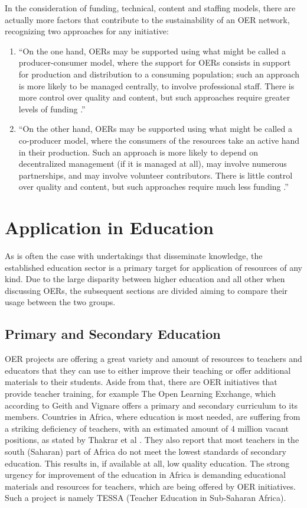 \documentclass[a4paper]{article}
\begin{document}
\noindent
In the consideration of funding, technical, content and staffing models, there are actually more factors that contribute to the sustainability of an OER network, recognizing two approaches for any initiative:
\begin{enumerate}
\item ``On the one hand, OERs may be supported using what might be called a producer-consumer model, where the support for OERs consists in support for production and distribution to a consuming population; such an approach is more likely to be managed centrally, to involve professional staff. There is more control over quality and content, but such approaches require greater levels of funding \cite{sustain}.''
\item ``On the other hand, OERs may be supported using what might be called a co-producer model, where the consumers of the resources take an active hand in their production. Such an approach is more likely to depend on decentralized management (if it is managed at all), may involve numerous partnerships, and may involve volunteer contributors. There is little control over quality and content, but such approaches require much less funding \cite{sustain}.''
\end{enumerate}

\section{Application in Education} \label{higher-ed}

As is often the case with undertakings that disseminate knowledge, the established education sector is a primary target for application of resources of any kind. Due to the large disparity between higher education and all other when discussing OERs, the subsequent sections are divided aiming to compare their usage between the two groups. 

\subsection{Primary and Secondary Education}
OER projects are offering a great variety and amount of resources to teachers and educators that they can use to either improve their teaching or offer additional materials to their students. Aside from that, there are OER initiatives that provide teacher training, for example The Open Learning Exchange, which according to Geith and Vignare \cite{ed-gap} offers a primary and secondary curriculum to its members. Countries in Africa, where education is most needed, are suffering from a striking deficiency of teachers, with an estimated amount of 4 million vacant positions, as stated by Thakrar et al \cite{africa}. They also report that most teachers in the south (Saharan) part of Africa do not meet the lowest standards of secondary education. This results in, if available at all, low quality education. The strong urgency for improvement of the education in Africa is demanding educational materials and resources for teachers, which are being offered by OER initiatives. Such a project is namely TESSA (Teacher Education in Sub-Saharan Africa).\\
\end{document}
